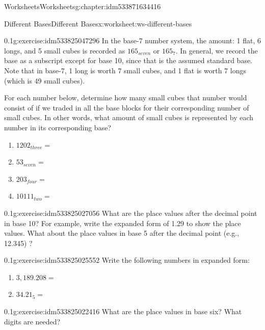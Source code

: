 \documentclass[twoside,11pt,]{book}
\begin{document}
\begin{chapterptx}{Worksheets}{}{Worksheets}{}{}{g:chapter:idm533871634416}
\restoregeometry
%
%
\typeout{************************************************}
\typeout{************************************************}
%
\begin{worksheet-section-numberless}{Different Bases}{}{Different Bases}{}{}{x:worksheet:ws-different-bases}
\begin{divisionexercise}{1}{}{0.1}{g:exercise:idm533825047296}%
In the base-7 number system, the amount: 1 flat, 6 longs, and 5 small cubes is recorded as \(165_{seven}\) or \(165_7\). In general, we record the base as a subscript except for base 10, since that is the assumed standard base.  Note that in base-7, 1 long is worth 7 small cubes, and 1 flat is worth 7 longs (which is 49 small cubes).%
\par
For each number below, determine how many small cubes that number would consist of if we traded in all the base blocks for their corresponding number of small cubes.  In other words, what amount of small cubes is represented by each number in its corresponding base?%
%
\begin{enumerate}[label=(\alph*)]
\item{}\(1202_{three}   = \)%
\item{}\(53_{seven}       = \)%
\item{}\(203_{four}       = \)%
\item{}\(10111_{two}       = \)%
\end{enumerate}
\end{divisionexercise}%
\begin{divisionexercise}{2}{}{0.1}{g:exercise:idm533825027056}%
What are the place values after the decimal point in base 10? For example, write the expanded form of 1.29 to show the place values. What about the place values in base 5 after the decimal point (e.g., 12.345) ?%
\end{divisionexercise}%
\begin{divisionexercise}{3}{}{0.1}{g:exercise:idm533825025552}%
Write the following numbers in expanded form:%
%
\begin{enumerate}[label=(\alph*)]
\item{}\(3,189.208 = \)%
\item{}\(34.21_5      = \)%
\end{enumerate}
\end{divisionexercise}%
\begin{divisionexercise}{4}{}{0.1}{g:exercise:idm533825022416}%
What are the place values in base six?  What digits are needed?%

\end{divisionexercise}
\end{worksheet-section-numberless}
\end{chapterptx}
\end{document}
